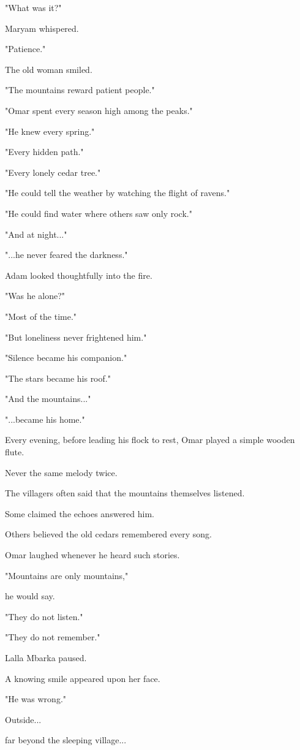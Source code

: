 \documentclass[12pt,openany]{book}
\begin{document}
"What was it?"

Maryam whispered.

"Patience."

The old woman smiled.

"The mountains reward patient people."

"Omar spent every season high among the peaks."

"He knew every spring."

"Every hidden path."

"Every lonely cedar tree."

"He could tell the weather by watching the flight of ravens."

"He could find water where others saw only rock."

"And at night..."

"...he never feared the darkness."

Adam looked thoughtfully into the fire.

"Was he alone?"

"Most of the time."

"But loneliness never frightened him."

"Silence became his companion."

"The stars became his roof."

"And the mountains..."

"...became his home."

Every evening, before leading his flock to rest, Omar played a simple wooden flute.

Never the same melody twice.

The villagers often said that the mountains themselves listened.

Some claimed the echoes answered him.

Others believed the old cedars remembered every song.

Omar laughed whenever he heard such stories.

"Mountains are only mountains,"

he would say.

"They do not listen."

"They do not remember."

Lalla Mbarka paused.

A knowing smile appeared upon her face.

"He was wrong."

Outside...

far beyond the sleeping village...
\end{document}
